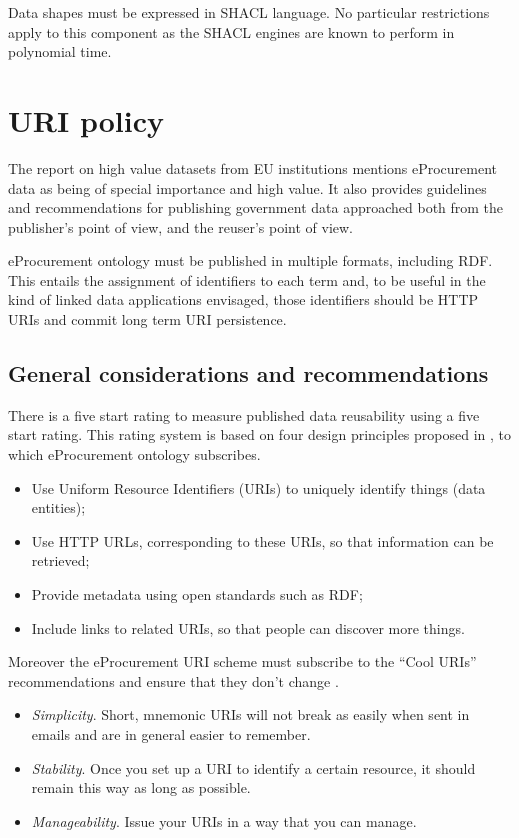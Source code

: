 	Data shapes must be expressed in SHACL language. No particular restrictions apply to this component as the SHACL engines are known to perform in polynomial time. 
	
\section{URI policy}
\label{sec:uri-policy}

	The report on high value datasets from EU institutions \citep{d-high-value-assets} mentions eProcurement data as being of special importance and high value. It also provides guidelines and recommendations for  publishing government data approached both from the publisher's point of view, and the reuser's point of view. 
	
	eProcurement ontology must be published in multiple formats, including RDF. This entails the assignment of identifiers to each term and, to be useful in the kind of linked data applications envisaged, those identifiers should be HTTP URIs and commit long term URI persistence.
	
	\subsection{General considerations and recommendations}
	\label{sec:considerations}
	There is a five start rating \cite{berners5star} to measure published data reusability using a five start rating. This rating system is based on four design principles proposed in \citet{berners2006linked}, to which eProcurement ontology subscribes.
	
	\begin{itemize}
		\item Use Uniform Resource Identifiers (URIs) to uniquely identify
		things (data entities);
		\item Use HTTP URLs, corresponding to these URIs, so that
		information can be retrieved;
		\item Provide metadata using open standards such as RDF;
		\item Include links to related URIs, so that people can discover more
		things.		
	\end{itemize} 
	
	Moreover the eProcurement URI scheme must subscribe to the ``Cool URIs'' recommendations \cite{cool-uri-cyganiak} and ensure that they don't change \cite{burners1998cool}. 
	
	\begin{itemize}
		\item \textit{Simplicity}. Short, mnemonic URIs will not break as easily when sent in emails and are in general easier to remember.
		\item \textit{Stability}. Once you set up a URI to identify a certain resource, it should remain this way as long as possible.
		\item  \textit{Manageability}. Issue your URIs in a way that you can manage. \cite{cool-uri-cyganiak}
	\end{itemize}

